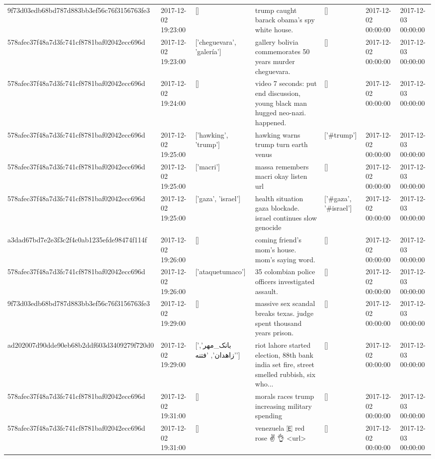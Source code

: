\begin{tabular}{lllllll}
9f73d03edb68bd787d883bb3ef56c76f3156763fe3 & 2017-12-02 19:23:00 & [] & trump caught barack obama's spy white house. & [] & 2017-12-02 00:00:00 & 2017-12-03 00:00:00 \\
578afec37f48a7d3fc741cf8781baf02042ecc696d & 2017-12-02 19:23:00 & ['cheguevara', 'galería'] & gallery bolivia commemorates 50 years murder cheguevara. & [] & 2017-12-02 00:00:00 & 2017-12-03 00:00:00 \\
578afec37f48a7d3fc741cf8781baf02042ecc696d & 2017-12-02 19:24:00 & [] & video 7 seconds: put end discussion, young black man hugged neo-nazi. happened. & [] & 2017-12-02 00:00:00 & 2017-12-03 00:00:00 \\
578afec37f48a7d3fc741cf8781baf02042ecc696d & 2017-12-02 19:25:00 & ['hawking', 'trump'] & hawking warns trump turn earth venus & ['#trump'] & 2017-12-02 00:00:00 & 2017-12-03 00:00:00 \\
578afec37f48a7d3fc741cf8781baf02042ecc696d & 2017-12-02 19:25:00 & ['macri'] & massa remembers macri okay listen url & [] & 2017-12-02 00:00:00 & 2017-12-03 00:00:00 \\
578afec37f48a7d3fc741cf8781baf02042ecc696d & 2017-12-02 19:25:00 & ['gaza', 'israel'] & health situation gaza blockade. israel continues slow genocide & ['#gaza', '#israel'] & 2017-12-02 00:00:00 & 2017-12-03 00:00:00 \\
a3dad67bd7e2e3f3c2f4c0ab1235efde98474f114f & 2017-12-02 19:26:00 & [] & coming friend's mom's house. mom's saying word. & [] & 2017-12-02 00:00:00 & 2017-12-03 00:00:00 \\
578afec37f48a7d3fc741cf8781baf02042ecc696d & 2017-12-02 19:26:00 & ['ataquetumaco'] & 35 colombian police officers investigated assault. & [] & 2017-12-02 00:00:00 & 2017-12-03 00:00:00 \\
9f73d03edb68bd787d883bb3ef56c76f3156763fe3 & 2017-12-02 19:29:00 & [] & massive sex scandal breaks texas. judge spent thousand years prison. & [] & 2017-12-02 00:00:00 & 2017-12-03 00:00:00 \\
ad202007d90dde90eb68b2ddf603d3409279f720d0 & 2017-12-02 19:29:00 & ['بانک_مهر', 'زاهدان', 'فتنه'] & riot lahore started election, 88th bank india set fire, street smelled rubbish, six who... & [] & 2017-12-02 00:00:00 & 2017-12-03 00:00:00 \\
578afec37f48a7d3fc741cf8781baf02042ecc696d & 2017-12-02 19:31:00 & [] & morals races trump increasing military spending & [] & 2017-12-02 00:00:00 & 2017-12-03 00:00:00 \\
578afec37f48a7d3fc741cf8781baf02042ecc696d & 2017-12-02 19:31:00 & [] & venezuela 🇪 red rose ✌️ 👌 <url> & [] & 2017-12-02 00:00:00 & 2017-12-03 00:00:00 \\

\end{tabular}
